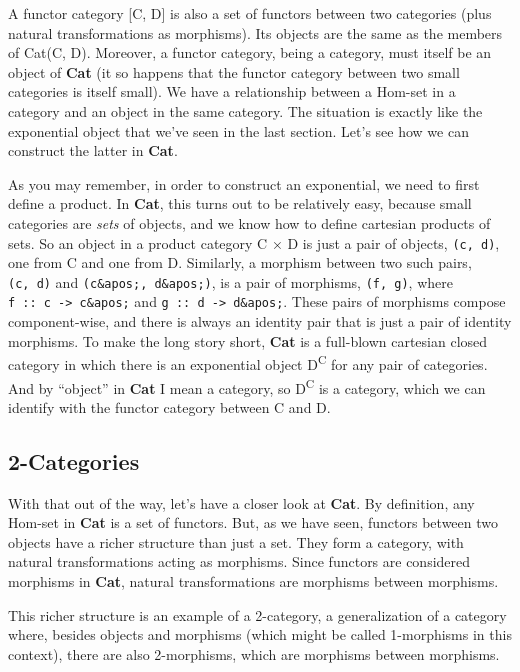 A functor category {[}C, D{]} is also a set of functors between two
categories (plus natural transformations as morphisms). Its objects are
the same as the members of Cat(C, D). Moreover, a functor category,
being a category, must itself be an object of \textbf{Cat} (it so
happens that the functor category between two small categories is itself
small). We have a relationship between a Hom-set in a category and an
object in the same category. The situation is exactly like the
exponential object that we've seen in the last section. Let's see how we
can construct the latter in \textbf{Cat}.

As you may remember, in order to construct an exponential, we need to
first define a product. In \textbf{Cat}, this turns out to be relatively
easy, because small categories are \emph{sets} of objects, and we know
how to define cartesian products of sets. So an object in a product
category C × D is just a pair of objects, \texttt{(c,\ d)}, one from C
and one from D. Similarly, a morphism between two such pairs,
\texttt{(c,\ d)} and \texttt{(c\&apos;,\ d\&apos;)}, is a pair of
morphisms, \texttt{(f,\ g)}, where
\texttt{f\ ::\ c\ -\textgreater{}\ c\&apos;} and
\texttt{g\ ::\ d\ -\textgreater{}\ d\&apos;}. These pairs of morphisms
compose component-wise, and there is always an identity pair that is
just a pair of identity morphisms. To make the long story short,
\textbf{Cat} is a full-blown cartesian closed category in which there is
an exponential object D\textsuperscript{C} for any pair of categories.
And by ``object'' in \textbf{Cat} I mean a category, so
D\textsuperscript{C} is a category, which we can identify with the
functor category between C and D.

\subsection{2-Categories}\label{categories}

With that out of the way, let's have a closer look at \textbf{Cat}. By
definition, any Hom-set in \textbf{Cat} is a set of functors. But, as we
have seen, functors between two objects have a richer structure than
just a set. They form a category, with natural transformations acting as
morphisms. Since functors are considered morphisms in \textbf{Cat},
natural transformations are morphisms between morphisms.

This richer structure is an example of a 2-category, a generalization of
a category where, besides objects and morphisms (which might be called
1-morphisms in this context), there are also 2-morphisms, which are
morphisms between morphisms.

